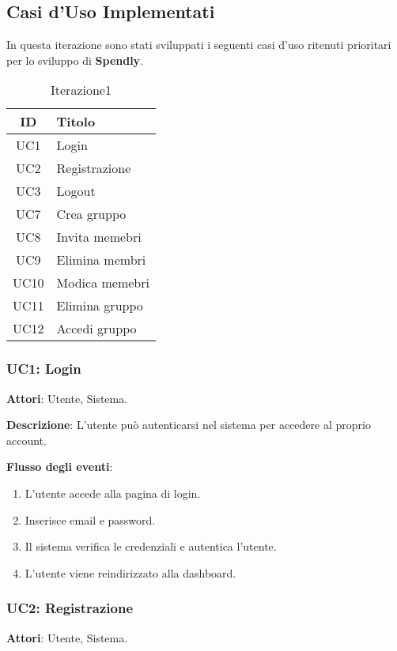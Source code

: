 \subsection{Casi d'Uso Implementati }

In questa iterazione sono stati sviluppati i seguenti casi d’uso ritenuti prioritari per lo sviluppo di \textbf{Spendly}.

\begin{table}[h]
    \centering
    \begin{tabular}{|c|l|}
    \hline
    \textbf{ID} & \textbf{Titolo} \\ \hline
    UC1 & Login\\ \hline
    UC2 & Registrazione \\ \hline
    UC3 & Logout \\ \hline
    UC7 & Crea gruppo \\ \hline
    UC8 & Invita memebri \\ \hline
    UC9 & Elimina membri \\ \hline
    UC10 & Modica memebri \\ \hline
    UC11 & Elimina gruppo \\ \hline
    UC12 & Accedi gruppo \\ \hline
    \end{tabular}
    \caption{Iterazione1}
\end{table}

\subsubsection{UC1: Login}
\textbf{Attori}: Utente, Sistema.

\textbf{Descrizione}: L'utente può autenticarsi nel sistema per accedere al proprio account.

\textbf{Flusso degli eventi}:
\begin{enumerate}
    \item L'utente accede alla pagina di login.
    \item Inserisce email e password.
    \item Il sistema verifica le credenziali e autentica l'utente.
    \item L'utente viene reindirizzato alla dashboard.
\end{enumerate}

\subsubsection{UC2: Registrazione}
\textbf{Attori}: Utente, Sistema.

